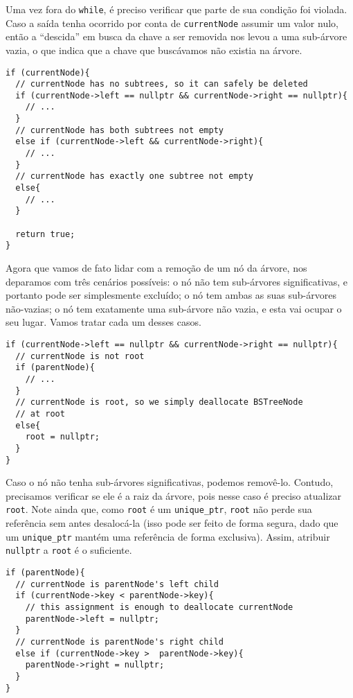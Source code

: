 \documentclass[11pt]{article}
\begin{document}
Uma vez fora do \texttt{while}, é preciso verificar que parte de sua
condição foi violada.  Caso a saída tenha ocorrido por conta de
\texttt{currentNode} assumir um valor nulo, então a ``descida'' em busca
da chave a ser removida nos levou a uma sub-árvore vazia, o que
indica que a chave que buscávamos não existia na árvore.

\begin{verbatim}
if (currentNode){
  // currentNode has no subtrees, so it can safely be deleted
  if (currentNode->left == nullptr && currentNode->right == nullptr){
    // ...
  }
  // currentNode has both subtrees not empty
  else if (currentNode->left && currentNode->right){
    // ...
  }
  // currentNode has exactly one subtree not empty
  else{
    // ...
  }

  return true;
}
\end{verbatim}

Agora que vamos de fato lidar com a remoção de um nó da árvore,
nos deparamos com três cenários possíveis: o nó não tem
sub-árvores significativas, e portanto pode ser simplesmente
excluído; o nó tem ambas as suas sub-árvores não-vazias; o nó tem
exatamente uma sub-árvore não vazia, e esta vai ocupar o seu
lugar.  Vamos tratar cada um desses casos.

\begin{verbatim}
if (currentNode->left == nullptr && currentNode->right == nullptr){
  // currentNode is not root
  if (parentNode){
    // ...
  }
  // currentNode is root, so we simply deallocate BSTreeNode
  // at root
  else{
    root = nullptr;
  }
}
\end{verbatim}

Caso o nó não tenha sub-árvores significativas, podemos
removê-lo. Contudo, precisamos verificar se ele é a raiz da
árvore, pois nesse caso é preciso atualizar \texttt{root}.  Note ainda
que, como \texttt{root} é um \texttt{unique\_ptr}, \texttt{root} não perde sua
referência sem antes desalocá-la (isso pode ser feito de forma
segura, dado que um \texttt{unique\_ptr} mantém uma referência de forma
exclusiva).  Assim, atribuir \texttt{nullptr} a \texttt{root} é o suficiente.

\begin{verbatim}
if (parentNode){
  // currentNode is parentNode's left child
  if (currentNode->key < parentNode->key){
    // this assignment is enough to deallocate currentNode
    parentNode->left = nullptr;
  }
  // currentNode is parentNode's right child
  else if (currentNode->key >  parentNode->key){
    parentNode->right = nullptr;
  }
}
\end{verbatim}
\end{document}
